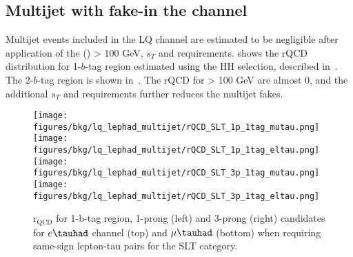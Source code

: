 \subsection{Multijet with fake-\tauhad in the \lephad channel}

Multijet events included in the LQ \lephad channel are estimated to be negligible after application of the \pT(\tauhad) > 100 GeV, $s_T$ and \MET requirements.  shows the rQCD distribution for 1-$b$-tag region estimated using the HH selection, described in~. The 2-$b$-tag region is shown in~. The rQCD for \tauhad \pT > 100 GeV are almost 0, and the additional $s_T$ and \MET requirements further reduces the multijet fakes.

\begin{figure}
  \centering
  \texttt{[image: figures/bkg/lq\_lephad\_multijet/rQCD\_SLT\_1p\_1tag\_mutau.png]}
  \texttt{[image: figures/bkg/lq\_lephad\_multijet/rQCD\_SLT\_1p\_1tag\_eltau.png]}\\
  \texttt{[image: figures/bkg/lq\_lephad\_multijet/rQCD\_SLT\_3p\_1tag\_mutau.png]}
  \texttt{[image: figures/bkg/lq\_lephad\_multijet/rQCD\_SLT\_3p\_1tag\_eltau.png]}\\
\caption{$\mathrm{r}_{\mathrm{QCD}}$ for 1-b-tag region, 1-prong (left) and 3-prong (right) \tauhad candidates for $e\tauhad$ channel (top) and $\mu\tauhad$ (bottom) when requiring same-sign lepton-tau pairs for the \lephad SLT category.}
  \label{fig:lq_lephad_rQCD}
\end{figure}

